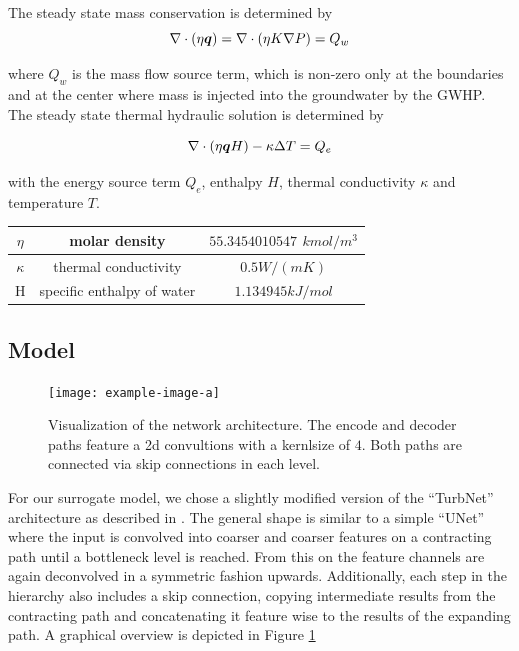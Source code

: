 \documentclass{article} %
\begin{document}


The steady state mass conservation is determined by 
\begin{equation}
   \label{eq:mass}
   \nabla \cdot \left(\eta {\bm{q}} \right) =  \nabla \cdot \left(\eta  K \nabla P  \right) = Q_w
\end{equation}

where $Q_w$ is the mass flow source term, which is non-zero only at the boundaries and at the center where mass is injected into the groundwater by the GWHP. The steady state thermal hydraulic solution is determined by

\begin{equation}
   \label{eq:energy}
   \nabla \cdot \left(\eta {\bm{q}} H\right) - \kappa \Delta T = Q_e
\end{equation}

with the energy source term $Q_e$, enthalpy $H$, thermal conductivity $\kappa$ and temperature $T$. 

\begin{tabular}{| c | c | c |}
   \hline
   $\eta$   & molar density        & $55.3454010547$ $kmol/m^3$ \\
   \hline
   $\kappa$ & thermal conductivity & $0.5 W/(mK)$                   \\
   \hline
   H        & specific enthalpy of water             & $1.134945 kJ/mol$                  \\
   \hline
\end{tabular}



\subsection*{Model}
\begin{figure}[htb]
   \centering
   \texttt{[image: example-image-a]}
   \caption{Visualization of the network architecture. The encode and decoder paths feature a 2d convultions with a kernlsize of $4$. Both paths are connected via skip connections in each level.}
   \label{fig:arch}
\end{figure}

For our surrogate model, we chose a slightly modified version of the ``TurbNet'' architecture as described in \cite{Thuerey2019}.
The general shape is similar to a simple ``UNet'' \cite{Ronneberger2015} where the input is convolved into coarser and coarser features on a contracting path until a bottleneck level is reached. 
From this on the feature channels are again deconvolved in a symmetric fashion upwards.
Additionally, each step in the hierarchy also includes a skip connection, copying intermediate results from the contracting path and concatenating it feature wise to the results of the expanding path.
A graphical overview is depicted in Figure \ref{fig:arch}
\end{document}

